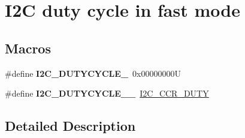 \hypertarget{group___i2_c__duty__cycle__in__fast__mode}{}\section{I2C duty cycle in fast mode}
\label{group___i2_c__duty__cycle__in__fast__mode}
\subsection*{Macros}
\begin{DoxyCompactItemize}
\item 
\mbox{\label{group___i2_c__duty__cycle__in__fast__mode_ga414df076d339793a7c761033346fd4ca}} 
\#define {\bfseries I2\+C\+\_\+\+D\+U\+T\+Y\+C\+Y\+C\+L\+E\+\_}~0x00000000U
\item 
\mbox{\label{group___i2_c__duty__cycle__in__fast__mode_gae9d1f8a140f052c1fcbcd87b4181f78d}} 
\#define {\bfseries I2\+C\+\_\+\+D\+U\+T\+Y\+C\+Y\+C\+L\+E\+\_\+\_}~\mbox{\hyperlink{group___peripheral___registers___bits___definition_ga851c8a6b598d54c1a805b1632a4078e5}{I2\+C\+\_\+\+C\+C\+R\+\_\+\+D\+U\+TY}}
\end{DoxyCompactItemize}


\subsection{Detailed Description}
